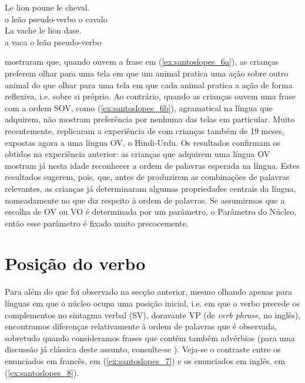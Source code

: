 \documentclass[output=paper]{LSP/langsci}
\begin{document}
\ea\label{ex:santoslopes_6}
\ea\label{ex:santoslopes_6a}
\gll Le lion poune le cheval.\\
o leão pseudo-verbo o cavalo\\
\ex\label{ex:santoslopes_6b}
\gll La vache le lion dase.\\
a vaca o leão pseudo-verbo\\
\zl

\citet{franck_etal2013} mostraram que, quando ouvem a frase em (\ref{ex:santoslopes_6a}), as crianças preferem olhar para uma tela em que um animal pratica uma ação sobre outro animal do que olhar para uma tela em que cada animal pratica a ação de forma reflexiva, i.e. sobre si próprio. Ao contrário, quando as crianças ouvem uma frase com a ordem SOV, como (\ref{ex:santoslopes_6b}), agramatical na língua que adquirem, não mostram preferência por nenhuma das telas em particular. Muito recentemente, \citet{gavarro_etal2015} replicaram a experiência de \citet{franck_etal2013} com crianças também de 19 meses, expostas agora a uma língua OV, o Hindi-Urdu. Os resultados confirmam os obtidos na experiência anterior: as crianças que adquirem uma língua OV mostram já nesta idade reconhecer a ordem de palavras esperada na língua. Estes resultados sugerem, pois, que, antes de produzirem as combinações de palavras relevantes, as crianças já determinaram algumas propriedades centrais da língua, nomeadamente no que diz respeito à ordem de palavras. Se assumirmos que a escolha de OV ou VO é determinada por um parâmetro, o Parâmetro do Núcleo, então esse parâmetro é fixado muito precocemente.
\section{Posição do verbo}
\label{sec:santoslopes_posicao_verbo}

Para além do que foi observado na secção anterior, mesmo olhando apenas para línguas em que o núcleo ocupa uma posição inicial, i.e. em que o verbo precede os complementos no sintagma verbal (SV), doravante VP (de \textit{verb phrase}, no inglês), encontramos diferenças relativamente à ordem de palavras que é observada, sobretudo quando consideramos frases que contêm também advérbios (para uma discussão já clássica deste assunto, consulte-se \citealt{pollock1989}). Veja-se o contraste entre os enunciados em francês, em (\ref{ex:santoslopes_7}) e os enunciados em inglês, em (\ref{ex:santoslopes_8}).
\end{document}
